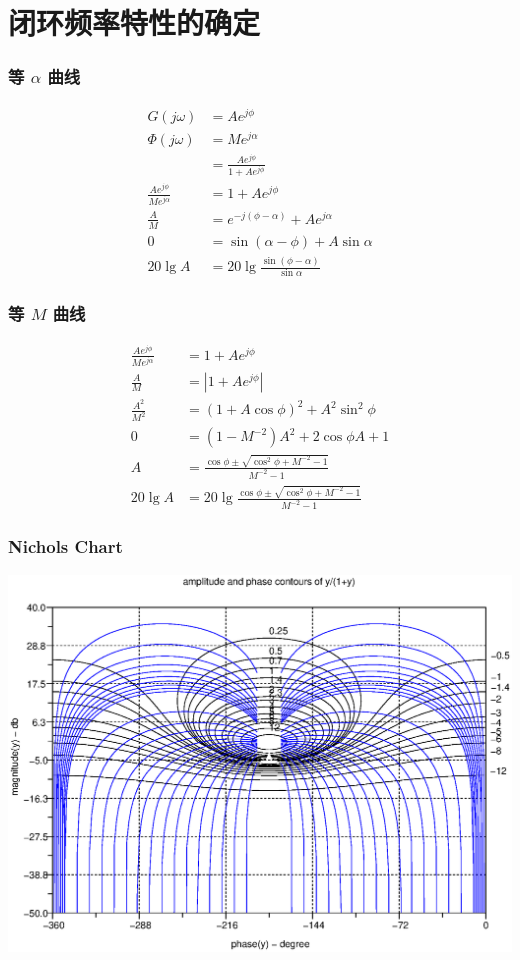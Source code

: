 \documentclass[table]{beamer}
\begin{document}
\section{闭环频率特性的确定}
\label{sec-2}
\begin{frame}
\frametitle{等 $\alpha$ 曲线}
\label{sec-2-1}

\begin{align*}
G(j\omega) &= Ae^{j\phi} \\
\Phi(j\omega) &= Me^{j\alpha}\\
 &= \frac{Ae^{j\phi}}{1+Ae^{j\phi}}\\
\frac{Ae^{j\phi}}{Me^{j\alpha}}&=1+Ae^{j\phi} \\
\frac{A}{M}&=e^{-j(\phi-\alpha)}+Ae^{j\alpha}\\
0 &= \sin(\alpha-\phi)+A\sin\alpha\\
20\lg A &=20\lg\frac{\sin(\phi-\alpha)}{\sin\alpha}
\end{align*}
\end{frame}
\begin{frame}
\frametitle{等 $M$ 曲线}
\label{sec-2-2}

\begin{align*}
\frac{Ae^{j\phi}}{Me^{j\alpha}}&=1+Ae^{j\phi} \\
\frac{A}{M}&=|1+Ae^{j\phi}|\\
\frac{A^2}{M^2}&=(1+A\cos\phi)^2+A^2\sin^2\phi\\
0 &=(1-M^{-2})A^2+2\cos\phi A+1\\
A &= \frac{\cos\phi\pm\sqrt{\cos^2\phi+M^{-2}-1}}{M^{-2}-1}\\
20\lg A &=20\lg \frac{\cos\phi\pm\sqrt{\cos^2\phi+M^{-2}-1}}{M^{-2}-1}
\end{align*}
\end{frame}
\begin{frame}
\frametitle{Nichols Chart}
\label{sec-2-3}

\includegraphics[width=.9\linewidth]{image/nichols_chart.eps}
\end{frame}
\end{document}
